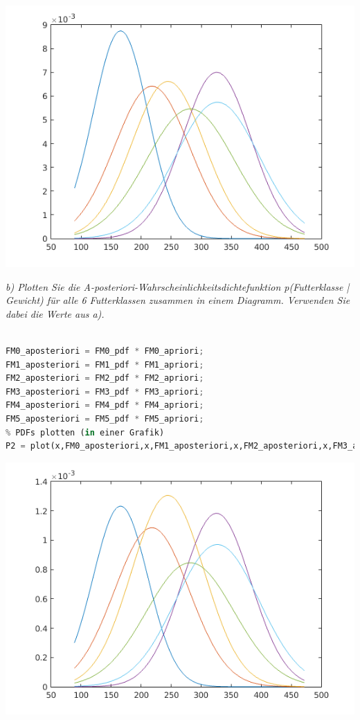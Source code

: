 \documentclass[12pt]{article}
\begin{document}
\includegraphics{ueb02_pdf_Aufg2a.png}



\textit{b) Plotten Sie die A­-posteriori-­Wahrscheinlichkeitsdichtefunktion p(Futterklasse | Gewicht) für alle 6 Futterklassen zusammen in einem Diagramm. Verwenden Sie dabei die Werte aus a).}\\
\\
\begin{lstlisting}[language=Python]
FM0_aposteriori = FM0_pdf * FM0_apriori;
FM1_aposteriori = FM1_pdf * FM1_apriori;
FM2_aposteriori = FM2_pdf * FM2_apriori;
FM3_aposteriori = FM3_pdf * FM3_apriori;
FM4_aposteriori = FM4_pdf * FM4_apriori;
FM5_aposteriori = FM5_pdf * FM5_apriori;
% PDFs plotten (in einer Grafik)
P2 = plot(x,FM0_aposteriori,x,FM1_aposteriori,x,FM2_aposteriori,x,FM3_aposteriori,x,FM4_aposteriori,x,FM5_aposteriori);
\end{lstlisting}
\includegraphics{ueb02_pdf_Aufg2b_gefragt.png}
\end{document}
